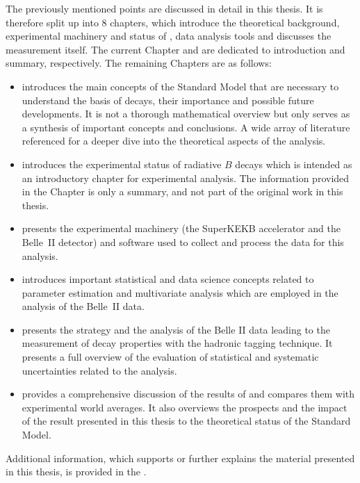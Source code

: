 The previously mentioned points are discussed in detail in this thesis.
It is therefore split up into 8 chapters, which introduce the theoretical background, experimental machinery and status of \BtoXsgamma, data analysis tools and discusses the measurement itself.
The current Chapter and  are dedicated to introduction and summary, respectively.
The remaining Chapters are as follows:
\begin{itemize}
    \item {} introduces the main concepts of the Standard Model that are necessary to understand the basis of \BtoXsgamma decays, their importance and possible future developments.
    It is not a thorough mathematical overview but only serves as a synthesis of important concepts and conclusions. 
    A wide array of literature referenced for a deeper dive into the theoretical aspects of the analysis.
    \item {} introduces the experimental status of radiative $B$ decays which is intended as an introductory chapter for experimental \BtoXsgamma analysis.
    The information provided in the Chapter is only a summary, and not part of the original work in this thesis.
    \item {} presents the experimental machinery (the SuperKEKB accelerator and the Belle~II detector) and software used to collect and process the data for this analysis.
    \item {} introduces important statistical and data science concepts related to parameter estimation and multivariate analysis which are employed in the analysis of the Belle~II data.
    \item {} presents the strategy and the analysis of the Belle II data leading to the measurement of \BtoXsgamma decay properties with the hadronic tagging technique.
    It presents a full overview of the evaluation of statistical and systematic uncertainties related to the analysis.
    \item {} provides a comprehensive discussion of the results of  and compares them with experimental world averages.
    It also overviews the prospects and the impact of the result presented in this thesis to the theoretical status of the Standard Model.
\end{itemize}
Additional information, which supports or further explains the material presented in this thesis, is provided in the .

